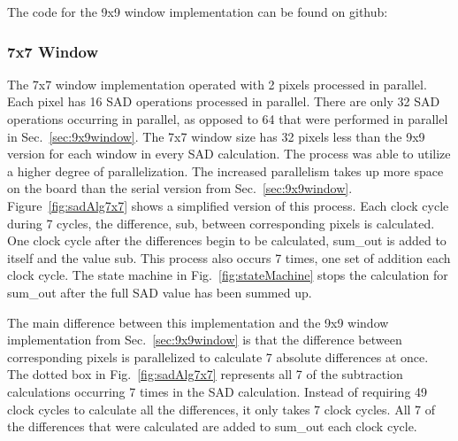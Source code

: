 The code for the 9x9 window implementation can be found on github:
\\

\subsubsection{7x7 Window}
\label{sec:7x7window}

The 7x7 window implementation operated with 2 pixels processed in parallel. Each pixel has 16 SAD operations processed in parallel. There are only 32 SAD operations occurring in parallel, as opposed to 64 that were performed in parallel in Sec.~\ref{sec:9x9window}. The 7x7 window size has 32 pixels less than the 9x9 version for each window in every SAD calculation. The process was able to utilize a higher degree of parallelization. The increased parallelism takes up more space on the board than the serial version from Sec.~\ref{sec:9x9window}. Figure~\ref{fig:sadAlg7x7} shows a simplified version of this process. Each clock cycle during 7 cycles, the difference, sub, between corresponding pixels is calculated. One clock cycle after the differences begin to be calculated, sum\_out is added to itself and the value sub. This process also occurs 7 times, one set of addition each clock cycle. The state machine in Fig.~\ref{fig:stateMachine} stops the calculation for sum\_out after the full SAD value has been summed up.

The main difference between this implementation and the 9x9 window implementation from Sec.~\ref{sec:9x9window} is that the difference between corresponding pixels is parallelized to calculate 7 absolute differences at once. The dotted box in Fig.~\ref{fig:sadAlg7x7} represents all 7 of the subtraction calculations occurring 7 times in the SAD calculation. Instead of requiring 49 clock cycles to calculate all the differences, it only takes 7 clock cycles. All 7 of the differences that were calculated are added to sum\_out each clock cycle.

